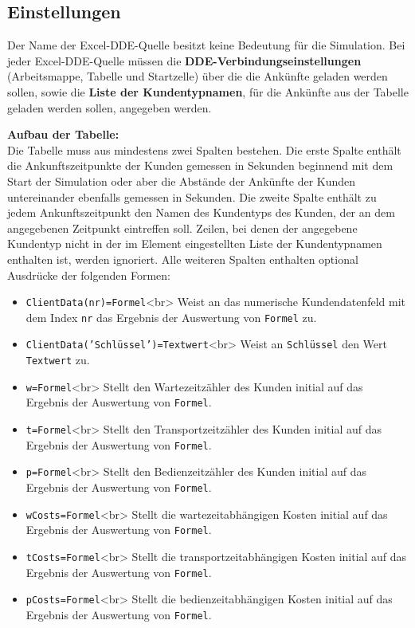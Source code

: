 \subsection*{Einstellungen}

Der Name der Excel-DDE-Quelle besitzt keine Bedeutung für die Simulation.
Bei jeder Excel-DDE-Quelle müssen die \textbf{DDE-Verbindungseinstellungen}
(Arbeitsmappe, Tabelle und Startzelle) über die die Ankünfte geladen werden sollen,
sowie die \textbf{Liste der Kundentypnamen},
für die Ankünfte aus der Tabelle geladen werden sollen, angegeben werden.

\textbf{Aufbau der Tabelle:}~\\
Die Tabelle muss aus mindestens zwei Spalten bestehen. Die erste Spalte enthält die Ankunftszeitpunkte
der Kunden gemessen in Sekunden beginnend mit dem Start der Simulation oder aber die Abstände
der Ankünfte der Kunden untereinander ebenfalls gemessen in Sekunden. Die zweite Spalte
enthält zu jedem Ankunftszeitpunkt den Namen des Kundentyps des Kunden, der an dem
angegebenen Zeitpunkt eintreffen soll. Zeilen, bei denen der angegebene Kundentyp
nicht in der im Element eingestellten Liste der Kundentypnamen enthalten ist, werden ignoriert.
Alle weiteren Spalten enthalten optional Ausdrücke der folgenden Formen:

\begin{itemize}
  \item \texttt{ClientData(nr)=Formel}<br>
  Weist an das numerische Kundendatenfeld mit dem Index \texttt{nr} das Ergebnis der
  Auswertung von \texttt{Formel} zu. 
  \item \texttt{ClientData('Schlüssel')=Textwert}<br>
  Weist an \texttt{Schlüssel} den Wert \texttt{Textwert} zu. 
  \item \texttt{w=Formel}<br>
  Stellt den Wartezeitzähler des Kunden initial auf das Ergebnis der
  Auswertung von \texttt{Formel}.   
  \item \texttt{t=Formel}<br>
  Stellt den Transportzeitzähler des Kunden initial auf das Ergebnis der
  Auswertung von \texttt{Formel}. 
  \item \texttt{p=Formel}<br>
  Stellt den Bedienzeitzähler des Kunden initial auf das Ergebnis der
  Auswertung von \texttt{Formel}. 
  \item \texttt{wCosts=Formel}<br>
  Stellt die wartezeitabhängigen Kosten initial auf das Ergebnis der
  Auswertung von \texttt{Formel}. 
  \item \texttt{tCosts=Formel}<br>
  Stellt die transportzeitabhängigen Kosten initial auf das Ergebnis der
  Auswertung von \texttt{Formel}. 
  \item \texttt{pCosts=Formel}<br>
  Stellt die bedienzeitabhängigen Kosten initial auf das Ergebnis der
  Auswertung von \texttt{Formel}. 
\end{itemize}


